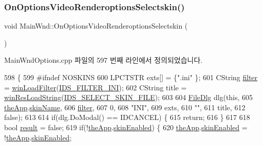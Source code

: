 \subsubsection{\texorpdfstring{On\+Options\+Video\+Renderoptions\+Selectskin()}{OnOptionsVideoRenderoptionsSelectskin()}}
{\footnotesize\ttfamily void Main\+Wnd\+::\+On\+Options\+Video\+Renderoptions\+Selectskin (\begin{DoxyParamCaption}{ }\end{DoxyParamCaption})\hspace{0.3cm}{\ttfamily [protected]}}



Main\+Wnd\+Options.\+cpp 파일의 597 번째 라인에서 정의되었습니다.


\begin{DoxyCode}
598 \{
599 \textcolor{preprocessor}{#ifndef NOSKINS}
600   LPCTSTR exts[] = \{\textcolor{stringliteral}{".ini"} \};
601   CString \mbox{\hyperlink{_s_d_l_8cpp_af0122ee4312107103b580a98c74a4ea6}{filter}} = \mbox{\hyperlink{class_main_wnd_a7adc4aa2a10246fa13637e9d0870843d}{winLoadFilter}}(\mbox{\hyperlink{resource_8h_ac36724534508f4d71f021cbbb8509b5f}{IDS\_FILTER\_INI}});
602   CString title = \mbox{\hyperlink{_win_res_util_8cpp_a416e85e80ab9b01376e87251c83d1a5a}{winResLoadString}}(\mbox{\hyperlink{resource_8h_aea85ae1de9ceda4a86b01d66e8cef134}{IDS\_SELECT\_SKIN\_FILE}});
603 
604   \mbox{\hyperlink{class_file_dlg}{FileDlg}} dlg(\textcolor{keyword}{this},
605               \mbox{\hyperlink{_v_b_a_8cpp_a8095a9d06b37a7efe3723f3218ad8fb3}{theApp}}.\mbox{\hyperlink{class_v_b_a_a61c4b5378e8a3a36cf65bf095cca7f47}{skinName}},
606               \mbox{\hyperlink{_s_d_l_8cpp_af0122ee4312107103b580a98c74a4ea6}{filter}},
607               0,
608               \textcolor{stringliteral}{"INI"},
609               exts,
610               \textcolor{stringliteral}{""}, 
611               title,
612               \textcolor{keyword}{false});
613 
614   \textcolor{keywordflow}{if}(dlg.DoModal() == IDCANCEL) \{
615     \textcolor{keywordflow}{return};
616   \}
617 
618   \textcolor{keywordtype}{bool} \mbox{\hyperlink{expr_8cpp_a8ad9a782076057c9c0a54c3a233468d4}{result}} = \textcolor{keyword}{false};
619   \textcolor{keywordflow}{if}(!\mbox{\hyperlink{_v_b_a_8cpp_a8095a9d06b37a7efe3723f3218ad8fb3}{theApp}}.\mbox{\hyperlink{class_v_b_a_a5cc7dbf58210b127d9e807e8a3262829}{skinEnabled}}) \{
620     \mbox{\hyperlink{_v_b_a_8cpp_a8095a9d06b37a7efe3723f3218ad8fb3}{theApp}}.\mbox{\hyperlink{class_v_b_a_a5cc7dbf58210b127d9e807e8a3262829}{skinEnabled}} = !\mbox{\hyperlink{_v_b_a_8cpp_a8095a9d06b37a7efe3723f3218ad8fb3}{theApp}}.\mbox{\hyperlink{class_v_b_a_a5cc7dbf58210b127d9e807e8a3262829}{skinEnabled}};    

\end{DoxyCode}
